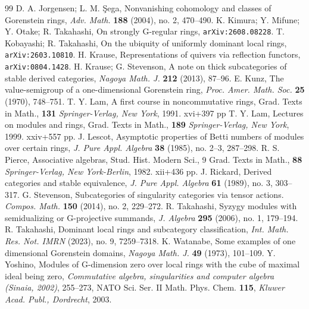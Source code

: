 \documentclass{amsart}
\theoremstyle{definition}
\theoremstyle{remark}
\numberwithin{equation}{thm}
\begin{document}
\begin{thebibliography}{99}
{\sc D. A. Jorgensen; L. M. \c{S}ega}, Nonvanishing cohomology and classes of Gorenstein rings, {\it Adv. Math.} {\bf 188} (2004), no. 2, 470--490.
{\sc K. Kimura; Y. Mifune; Y. Otake; R. Takahashi}, On strongly G-regular rings, {\tt arXiv:2608.08228}.
{\sc T. Kobayashi; R. Takahashi}, On the ubiquity of uniformly dominant local rings, {\tt arXiv:2603.10810}.
{\sc H. Krause}, Representations of quivers via reflection functors, {\tt arXiv:0804.1428}.
{\sc H. Krause; G. Stevenson}, A note on thick subcategories of stable derived categories, {\it Nagoya Math. J.} {\bf 212} (2013), 87--96.
{\sc E. Kunz}, The value-semigroup of a one-dimensional Gorenstein ring, {\it Proc. Amer. Math. Soc.} {\bf 25} (1970), 748--751.
{\sc T. Y. Lam}, A first course in noncommutative rings, Grad. Texts in Math., {\bf 131} {\it Springer-Verlag, New York}, 1991. xvi+397 pp
{\sc T. Y. Lam}, Lectures on modules and rings, Grad. Texts in Math., {\bf 189} {\it Springer-Verlag, New York}, 1999. xxiv+557 pp.
{\sc J. Lescot}, Asymptotic properties of Betti numbers of modules over certain rings, {\it J. Pure Appl. Algebra} {\bf 38} (1985), no. 2--3, 287--298.
{\sc R. S. Pierce}, Associative algebras, Stud. Hist. Modern Sci., 9 Grad. Texts in Math., {\bf 88} {\it Springer-Verlag, New York-Berlin}, 1982. xii+436 pp.
{\sc J. Rickard}, Derived categories and stable equivalence, {\it J. Pure Appl. Algebra} {\bf 61} (1989), no. 3, 303--317.
{\sc G. Stevenson}, Subcategories of singularity categories via tensor actions. {\it Compos. Math.} {\bf 150} (2014), no. 2, 229--272.
{\sc R. Takahashi}, Syzygy modules with semidualizing or G-projective summands, {\it J. Algebra} {\bf 295} (2006), no. 1, 179--194.
{\sc R. Takahashi}, Dominant local rings and subcategory classification, {\it Int. Math. Res. Not. IMRN} (2023), no. 9, 7259--7318.
{\sc K. Watanabe}, Some examples of one dimensional Gorenstein domains, {\it Nagoya Math. J.} {\bf 49} (1973), 101--109.
{\sc Y. Yoshino}, Modules of G-dimension zero over local rings with the cube of maximal ideal being zero, {\it Commutative algebra, singularities and computer algebra (Sinaia, 2002)}, 255--273, NATO Sci. Ser. II Math. Phys. Chem. {\bf 115}, {\it Kluwer Acad. Publ., Dordrecht}, 2003.
\end{thebibliography}
\end{document}

